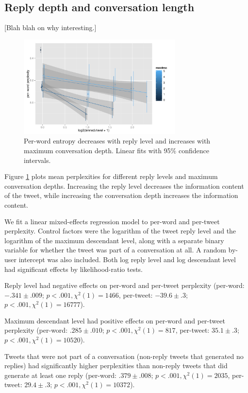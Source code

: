 \documentclass[11pt,letterpaper]{article}
\begin{document}
\subsection{Reply depth and conversation length}
[Blah blah on why interesting.]

\begin{figure}
 \centering
  \includegraphics[width=3.25in]{figures/rlevel-and-maxdesc.pdf}
 \caption{Per-word entropy decreases with reply level and increases with maximum conversation depth. Linear fits with 95\% confidence intervals.}\label{fig:rlevel-maxdesc}\vspace*{-.5em}
\end{figure}


Figure \ref{fig:rlevel-maxdesc} plots mean perplexities for different reply levels and maximum conversation depths. Increasing the reply level decreases the information content of the tweet, while increasing the conversation depth increases the information content.

We fit a linear mixed-effects regression model to per-word and per-tweet perplexity.  Control factors were the logarithm of the tweet reply level and the logarithm of the maximum descendant level, along with a separate binary variable for whether the tweet was part of a conversation at all. A random by-user intercept was also included.  Both log reply level and log descendant level had significant effects by likelihood-ratio tests.

Reply level had negative effects on per-word and per-tweet perplexity (per-word: $-.341 \pm .009$; $p < .001, \chi^2(1) = 1466$, per-tweet: $-39.6 \pm .3$; $p < .001, \chi^2(1) =  16777$).

Maximum descendant level had positive effects on per-word and per-tweet perplexity (per-word: $.285 \pm .010$; $p < .001, \chi^2(1) = 817$, per-tweet: $35.1 \pm .3$; $p < .001, \chi^2(1) = 10520$).

Tweets that were not part of a conversation (non-reply tweets that generated no replies) had significantly higher perplexities than non-reply tweets that did generate at least one reply (per-word: $.379 \pm .008$; $p < .001, \chi^2(1) = 2035$, per-tweet: $29.4 \pm .3$; $p < .001, \chi^2(1) = 10372$).  
\end{document}
